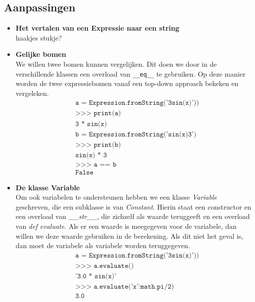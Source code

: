 \documentclass[12pt]{article}
\begin{document}
\subsection{Aanpassingen}


\begin{itemize}
\item \textbf{Het vertalen van een Expressie naar een string} \\
haakjes stukje?

\item \textbf{Gelijke bomen} \\
We willen twee bomen kunnen vergelijken. Dit doen we door in de verschillende klassen een overload van \texttt{\_\_eq\_\_} te gebruiken. Op deze manier worden de twee expressiebomen vanaf een top-down approach bekeken en vergeleken.
\begin{align*}
&\texttt{a = Expression.fromString('3sin(x)'))}\\
&\texttt{>>> print(a)}\\
&\texttt{3 * sin(x)}\\
&\texttt{b = Expression.fromString('sin(x)3')}\\
&\texttt{>>> print(b)}\\
&\texttt{sin(x) * 3}\\
&\texttt{>>> a == b}\\
&\texttt{False}
\end{align*}


\item \textbf{De klasse Variable} \\
Om ook variabelen te ondersteunen hebben we een klasse \textit{Variable} geschreven, die een subklasse is van \textit{Constant}. Hierin staat een constructor en een overload van  \textit{\_\_str\_\_}, die zichzelf als waarde teruggeeft en een overload van \textit{def evaluate}. Als er een waarde is meegegeven voor de variabele, dan willen we deze waarde gebruiken in de berekening. Als dit niet het geval is, dan moet de variabele als variabele worden teruggegeven.
\begin{align*}
&\texttt{a = Expression.fromString('3sin(x)'))}\\
&\texttt{>>> a.evaluate()}\\
&\texttt{'3.0 * sin(x)'}\\
&\texttt{>>> a.evaluate({'x':math.pi/2})}\\
&\texttt{3.0}\\
\end{align*}


\end{itemize}
\end{document}
